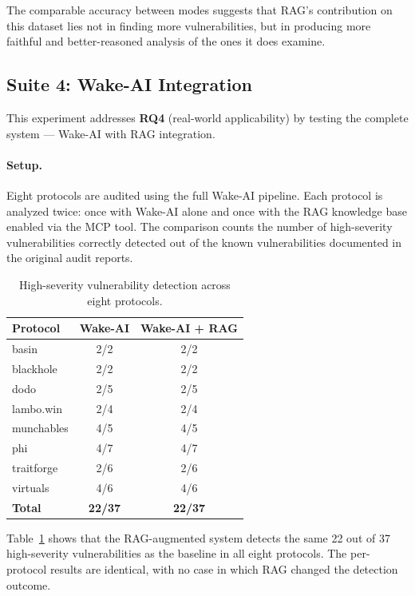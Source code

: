 The comparable accuracy between modes suggests that RAG's contribution on this dataset lies not in finding more vulnerabilities, but in producing more faithful and better-reasoned analysis of the ones it does examine.

\subsection{Suite 4: Wake-AI Integration}
\label{subsec:suite4}

This experiment addresses \textbf{RQ4} (real-world applicability) by testing the complete system --- Wake-AI with RAG integration.

\paragraph{Setup.} Eight protocols are audited using the full Wake-AI pipeline. Each protocol is analyzed twice: once with Wake-AI alone and once with the RAG knowledge base enabled via the MCP tool. The comparison counts the number of high-severity vulnerabilities correctly detected out of the known vulnerabilities documented in the original audit reports.

\begin{table}[!ht]
\centering
\small
\renewcommand{\arraystretch}{1.2}
\begin{tabular}{lcc}
\toprule
\textbf{Protocol} & \textbf{Wake-AI} & \textbf{Wake-AI + RAG} \\
\midrule
basin             & 2/2  & 2/2  \\
blackhole         & 2/2  & 2/2  \\
dodo              & 2/5  & 2/5  \\
lambo.win         & 2/4  & 2/4  \\
munchables        & 4/5  & 4/5  \\
phi               & 4/7  & 4/7  \\
traitforge        & 2/6  & 2/6  \\
virtuals          & 4/6  & 4/6  \\
\midrule
\textbf{Total}    & \textbf{22/37} & \textbf{22/37} \\
\bottomrule
\end{tabular}
\caption[High-severity vulnerability detection.]{High-severity vulnerability detection across eight protocols.}
\label{tab:rag_wake_ai}
\end{table}

Table~\ref{tab:rag_wake_ai} shows that the RAG-augmented system detects the same 22 out of 37 high-severity vulnerabilities as the baseline in all eight protocols. The per-protocol results are identical, with no case in which RAG changed the detection outcome.

